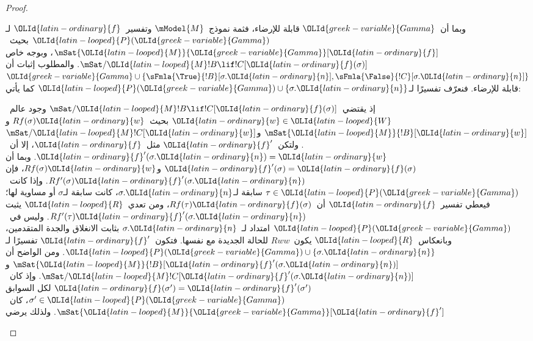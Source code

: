 \documentclass[../../../include/open-logic-section]{subfiles}
\begin{document}
\begin{proof}
\begin{enumerate}
  وبما أن~${\OLId{greek-variable}{Gamma}}$ قابلة للإرضاء، فثمة نموذج~$\mModel{M}$ وتفسير~${\OLId{latin-ordinary}{f}}$
  لـ${\OLId{latin-looped}{P}}({\OLId{greek-variable}{Gamma}})$ بحيث~$\mSat{{\OLId{latin-looped}{M}}}{{\OLId{greek-variable}{Gamma}}}[{\OLId{latin-ordinary}{f}}]$، وبوجه خاص
  $\mSat/{{\OLId{latin-looped}{M}}}{!B \lif !C}[{\OLId{latin-ordinary}{f}}(\sigma)]$. والمطلوب إثبات أن
  ${\OLId{greek-variable}{Gamma}} \cup \{\sFmla{\True}{!B}[\sigma.{\OLId{latin-ordinary}{n}}],
  \sFmla{\False}{!C}[\sigma.{\OLId{latin-ordinary}{n}}]\}$ قابلة للإرضاء. فنعرّف
  تفسيرًا لـ${\OLId{latin-looped}{P}}({\OLId{greek-variable}{Gamma}}) \cup \{\sigma.{\OLId{latin-ordinary}{n}}\}$ كما يأتي:

  إذ يقتضي~$\mSat/{{\OLId{latin-looped}{M}}}{!B \lif !C}[{\OLId{latin-ordinary}{f}}(\sigma)]$ وجود عالم~${\OLId{latin-ordinary}{w}} \in {\OLId{latin-looped}{W}}$
  بحيث~$Rf(\sigma){\OLId{latin-ordinary}{w}}$ و$\mSat{{\OLId{latin-looped}{M}}}{!B}[{\OLId{latin-ordinary}{w}}]$ و$\mSat/{{\OLId{latin-looped}{M}}}{!C}[{\OLId{latin-ordinary}{w}}]$.
  ولتكن~${\OLId{latin-ordinary}{f}}'$ مثل~${\OLId{latin-ordinary}{f}}$، إلا أن~${\OLId{latin-ordinary}{f}}'(\sigma.{\OLId{latin-ordinary}{n}}) = {\OLId{latin-ordinary}{w}}$. وبما أن
  ${\OLId{latin-ordinary}{f}}'(\sigma) = {\OLId{latin-ordinary}{f}}(\sigma)$ و$Rf(\sigma){\OLId{latin-ordinary}{w}}$، فإن
  $Rf'(\sigma){\OLId{latin-ordinary}{f}}'(\sigma.{\OLId{latin-ordinary}{n}})$. وإذا كانت~$\tau\in {\OLId{latin-looped}{P}}({\OLId{greek-variable}{Gamma}})$ سابقة
  لـ$\sigma.{\OLId{latin-ordinary}{n}}$، كانت سابقة لـ$\sigma$ أو مساوية لها؛ فيعطي تفسير~${\OLId{latin-ordinary}{f}}$
  أن~$Rf(\tau){\OLId{latin-ordinary}{f}}(\sigma)$، ومن تعدي~${\OLId{latin-looped}{R}}$ يثبت
  $Rf'(\tau){\OLId{latin-ordinary}{f}}'(\sigma.{\OLId{latin-ordinary}{n}})$. وليس في~${\OLId{latin-looped}{P}}({\OLId{greek-variable}{Gamma}})$ امتداد لـ~$\sigma.{\OLId{latin-ordinary}{n}}$
  بثابت الانغلاق والجدة المتقدمين، وبانعكاس~${\OLId{latin-looped}{R}}$ يكون~$Rww$ للحالة
  الجديدة مع نفسها. فتكون~${\OLId{latin-ordinary}{f}}'$ تفسيرًا لـ
  ${\OLId{latin-looped}{P}}({\OLId{greek-variable}{Gamma}}) \cup \{\sigma.{\OLId{latin-ordinary}{n}}\}$. ومن الواضح أن
  $\mSat{{\OLId{latin-looped}{M}}}{!B}[{\OLId{latin-ordinary}{f}}'(\sigma.{\OLId{latin-ordinary}{n}})]$ و$\mSat/{{\OLId{latin-looped}{M}}}{!C}[{\OLId{latin-ordinary}{f}}'(\sigma.{\OLId{latin-ordinary}{n}})]$.
  وإذ كان~${\OLId{latin-ordinary}{f}}(\sigma') = {\OLId{latin-ordinary}{f}}'(\sigma')$ لكل السوابق
  $\sigma' \in {\OLId{latin-looped}{P}}({\OLId{greek-variable}{Gamma}})$، كان~$\mSat{{\OLId{latin-looped}{M}}}{{\OLId{greek-variable}{Gamma}}}[{\OLId{latin-ordinary}{f}}']$. ولذلك يرضي

\end{enumerate}
\end{proof}
\end{document}
